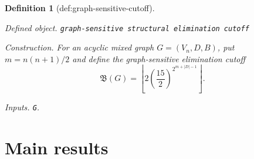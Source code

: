 \documentclass{article}
\newtheorem{definition}{Definition}
\begin{document}
\begin{definition}[def:graph-sensitive-cutoff]\label{def:graph-sensitive-cutoff}
\par\smallskip\noindent\emph{Defined object.} \texttt{graph-\allowbreak{}sensitive structural elimination cutoff}
\par\smallskip\noindent\emph{Construction.} For an acyclic mixed graph \(G=(V_n,D,B)\), put \(m=n(n+1)/2\) and define the graph-sensitive elimination cutoff
\[
 \mathfrak B(G)=
 \left\lfloor
 2\left(\frac{15}{2}\right)^{2^{m+|D|-1}}
 \right\rfloor.
\]
\par\smallskip\noindent\emph{Inputs.} \texttt{G}.
\end{definition}

\section{Main results}
\end{document}
